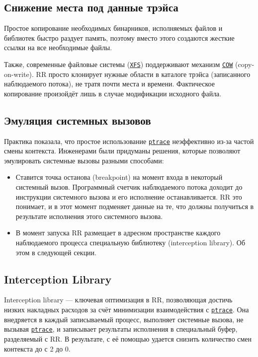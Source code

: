 \subsection{Снижение места под данные трэйса}

Простое копирование необходимых бинарников, исполняемых файлов и библиотек быстро раздует память, 
поэтому вместо этого создаются жесткие ссылки 
на все необходимые файлы.

Также, современные файловые системы (\href{https://ru.wikipedia.org/wiki/XFS}{\texttt{XFS}})
поддерживают механизм \href{https://en.wikipedia.org/wiki/Copy-on-write}{\texttt{COW}} (copy-on-write). 
RR просто клонирует нужные области в каталоге трэйса (записанного наблюдаемого потока), не тратя почти места и времени. 
Фактическое копирование произойдёт лишь в случае модификации исходного файла.

\subsection{Эмуляция системных вызовов}

Практика показала, что простое использование \href{https://man7.org/linux/man-pages/man2/ptrace.2.html}{\texttt{ptrace}} 
неэффективно из-за частой смены контекста.
Инженерами \cite{rr-paper} были придуманы решения, которые позволяют эмулировать системные вызовы разными способами:

\begin{itemize}
  \item Ставится точка останова (breakpoint) на момент входа в некоторый системный вызов. 
  Программный счетчик наблюдаемого потока доходит до инструкции системного вызова и его исполнение останавливается. 
  RR это понимает, и в этот момент подменяет данные на те, что должны получиться в результате 
  исполнения этого системного вызова.
  \item В момент запуска RR размещает в адресном пространстве каждого наблюдаемого процесса специальную библиотеку 
  (interception library). Об этом в следующей секции.
\end{itemize}

\subsection{Interception Library}

Interception library — ключевая оптимизация в RR, позволяющая достичь низких накладных расходов за счёт минимизации взаимодействия с 
\href{https://man7.org/linux/man-pages/man2/ptrace.2.html}{\texttt{ptrace}}.
Она внедряется в каждый записываемый процесс, выполняет системные вызова, не вызывая
\href{https://man7.org/linux/man-pages/man2/ptrace.2.html}{\texttt{ptrace}},
и записывает результаты исполнения в специальный буфер, разделяемый с RR.
В результате, с её помощью удается снизить количество смен контекста до с 2 до 0.

